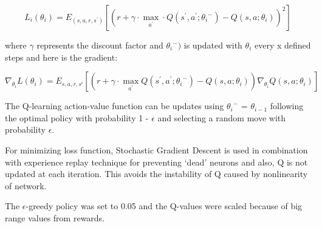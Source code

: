 \begin{equation}
	L_i(\theta_i)=E_{(s,a,r,s^{\prime})}[(r + \gamma\cdot\max_{a^{\prime}}\cdot Q(s^{\prime},a^{\prime};{\theta_i}^-) - Q(s,a;\theta_i))^2]
\end{equation}

where $\gamma$ represents the discount factor and ${\theta_i}^-)$ is updated with $\theta_i$ every x defined steps and here is the gradient\cite{nature}:

\begin{equation}
\nabla_{\theta_i}L(\theta_i) = E_{s,a,r,{s^i}}[(r + \gamma\cdot\max_{a^{\prime}}Q(s^\prime, a^\prime;{\theta_i}^-)-Q(s,a;\theta_i))\nabla_{\theta_i}Q(s,a;\theta_i)]
\end{equation}

The Q-learning action-value function can be updates using ${\theta_i}^-$ = $\theta_{i-1}$ following the optimal policy with probability 1 - $\epsilon$ and selecting a random move with probability $\epsilon$. 

For minimizing loss function, Stochastic Gradient Descent is used in combination with experience replay technique for preventing `dead' neurons and also, Q is not updated at each iteration. This avoids the instability of Q caused by nonlinearity of network.

The $\epsilon$-greedy policy was set to 0.05 and the Q-values were scaled because of big range values from rewards.
\newpage
